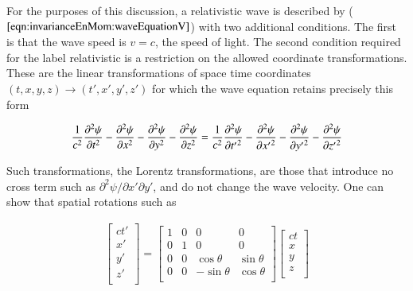 For the purposes of this discussion, a relativistic wave is described by ($\ref{eqn:invarianceEnMom:waveEquationV}$) with two
additional conditions.  The first is that the wave speed is
$v = c$, the speed of light.  The second condition required for the label relativistic 
is a restriction on the allowed coordinate transformations.  These are the linear transformations
of space time coordinates
$(t,x,y,z) \rightarrow (t', x', y', z')$ for which the wave equation retains precisely this form

\begin{align}\label{eqn:invarianceEnMom:waveEquationInv}
\frac{1}{c^2} \frac{\partial^2 \psi}{\partial {t}^2} 
- \frac{\partial^2 \psi}{\partial {x}^2} 
- \frac{\partial^2 \psi}{\partial {y}^2} 
- \frac{\partial^2 \psi}{\partial {z}^2} 
=
\frac{1}{c^2} \frac{\partial^2 \psi}{\partial {t'}^2} 
- \frac{\partial^2 \psi}{\partial {x'}^2} 
- \frac{\partial^2 \psi}{\partial {y'}^2} 
- \frac{\partial^2 \psi}{\partial {z'}^2} 
\end{align}

Such transformations, the Lorentz transformations,
are those that introduce no cross term such as $\partial^2 \psi/\partial x' \partial y'$,
and do not change the wave velocity.  One can show that spatial rotations such as

\begin{align}
\begin{bmatrix}
ct' \\
x' \\
y' \\
z' \\
\end{bmatrix}
=
\begin{bmatrix}
1 & 0 & 0 & 0 \\
0 & 1 & 0 & 0 \\
0 & 0 & \cos\theta & \sin\theta \\
0 & 0 & -\sin\theta & \cos\theta \\
\end{bmatrix}
\begin{bmatrix}
ct \\
x \\
y \\
z \\
\end{bmatrix}
\end{align}

